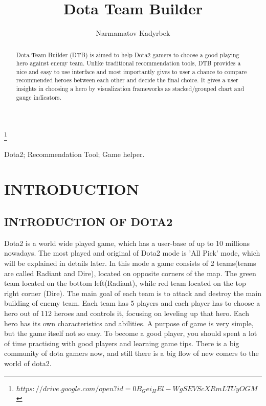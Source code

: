 \documentclass[twocolumn]{autart}    %
\begin{document}
\begin{frontmatter}

\title{Dota Team Builder} %

\thanks[footnoteinfo]{$https://drive.google.com/open?id=0B_Gei_HEl-WgSEVScXRmLTUyOGM$}
							
\author{Narmamatov Kadyrbek}

\address{South Korea, UNIST} 

          
\begin{keyword}                             
Dota2; Recommendation Tool; Game helper.             
\end{keyword}                             

\begin{abstract}                          	
Dota Team Builder (DTB) is aimed to help Dota2 gamers to choose a good playing hero against enemy team. Unlike traditional recommendation tools, DTB provides a nice and easy to use interface and most importantly gives to user a chance to compare recommended heroes between each other and decide the final choice. It gives a user insights in choosing a hero by visualization frameworks as stacked/grouped chart and gauge indicators.   

\end{abstract}

\end{frontmatter}

\section {INTRODUCTION}

\subsection{INTRODUCTION OF DOTA2}
	Dota2 is a world wide played game, which has a user-base of up to 10 millions nowadays. The most played and original of Dota2 mode is 'All Pick' mode, which will be explained in details later. In this mode a game consists of 2 teams(teams are called Radiant and Dire), located on opposite corners of the map. The green team located on the bottom left(Radiant), while red team located on the top right corner (Dire). 
 The main goal of each team is to attack and destroy the main building of enemy team. Each team has 5 players and each player has to choose a hero out of 112 heroes and controls it, focusing on leveling up that hero. Each hero has its own characteristics and abilities. 
A purpose of game is very simple, but the game itself not so easy. To become a good player, you should spent a lot of time practising with good players and learning game tips. There is a big community of dota gamers now, and still there is a big flow of new comers to the world of dota2. 
\end{document}
